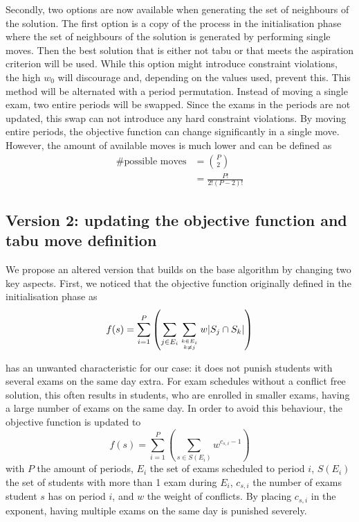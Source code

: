 Secondly, two options are now available when generating the set of neighbours of the solution. The first option is a copy of the process in the initialisation phase where the set of neighbours of the solution is generated by performing single moves. Then the best solution that is either not tabu or that meets the aspiration criterion will be used. While this option might introduce constraint violations, the high $w_0$ will discourage and, depending on the values used, prevent this. This method will be alternated with a period permutation. Instead of moving a single exam, two entire periods will be swapped. Since the exams in the periods are not updated, this swap can not introduce any hard constraint violations. By moving entire periods, the objective function can change significantly in a single move. However, the amount of available moves is much lower and can be defined as
\begin{equation}
\begin{split}
   \text{\# possible moves}  & = \binom{P}{2}   \\
   & = \frac{P!}{2!(P-2)!}
\end{split}
\end{equation}

\subsection{Version 2: updating the objective function and tabu move definition}

We propose an altered version that builds on the base algorithm by changing two key aspects. First, we noticed that the objective function originally defined in the initialisation phase as   
\begin{equation}
    f(s) = \sum_{i=1}^{P} \left( \sum_{j \in E_i}^{}\sum_{k \in E_i \atop k \neq j}^{}w \lvert S_j \cap S_k \rvert \right)
\end{equation}

has an unwanted characteristic for our case: it does not punish students with several exams on the same day extra. For exam schedules without a conflict free solution, this often results in students, who are enrolled in smaller exams, having a large number of exams on the same day. In order to avoid this behaviour, the objective function is updated to
\begin{equation}
    f(s) = \sum_{i=1}^{P} \left( \sum_{s \in S(E_i)}^{}w^{c_{s,i} - 1}\right)
\end{equation}
with $P$ the amount of periods, $E_i$ the set of exams scheduled to period $i$, $S(E_i)$ the set of students with more than 1 exam during $E_i$, $c_{s,i}$ the number of exams student $s$ has on period $i$, and $w$ the weight of conflicts. By placing $c_{s,i}$ in the exponent, having multiple exams on the same day is punished severely. 

